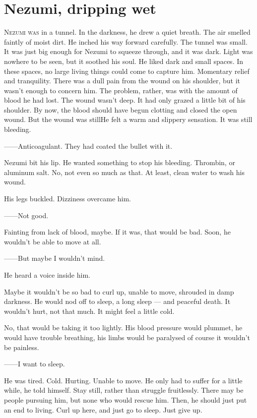 
\chapter{Nezumi, dripping wet}

\lettrine{N}{ezumi was} in a tunnel. In the darkness, he drew a quiet breath. The air
smelled faintly of moist dirt. He inched his way forward carefully. The
tunnel was small. It was just big enough for Nezumi to squeeze through,
and it was dark. Light was nowhere to be seen, but it soothed his soul.
He liked dark and small spaces. In these spaces, no large living things
could come to capture him. Momentary relief and tranquility. There was a
dull pain from the wound on his shoulder, but it wasn't enough to
concern him. The problem, rather, was with the amount of blood he had
lost. The wound wasn't deep. It had only grazed a little bit of his
shoulder. By now, the blood should have begun clotting and closed the
open wound. But the wound was still\el He felt a warm and slippery
sensation. It was still bleeding.

------Anticoagulant. They had coated the bullet with it.

Nezumi bit his lip. He wanted something to stop his bleeding. Thrombin,
or aluminum salt. No, not even so much as that. At least, clean water to
wash his wound.

His legs buckled. Dizziness overcame him.

------Not good.

Fainting from lack of blood, maybe. If it was, that would be bad. Soon,
he wouldn't be able to move at all.

------But maybe I wouldn't mind.

He heard a voice inside him.

Maybe it wouldn't be so bad to curl up, unable to move, shrouded in damp
darkness. He would nod off to sleep, a long sleep --- and peaceful death.
It wouldn't hurt, not that much. It might feel a little cold.

No, that would be taking it too lightly. His blood pressure would
plummet, he would have trouble breathing, his limbs would be paralysed
\el of course it wouldn't be painless.

------I want to sleep.

He was tired. Cold. Hurting. Unable to move. He only had to suffer for a
little while, he told himself. Stay still, rather than struggle
fruitlessly. There may be people pursuing him, but none who would rescue
him. Then, he should just put an end to living. Curl up here, and just
go to sleep. Just give up.

